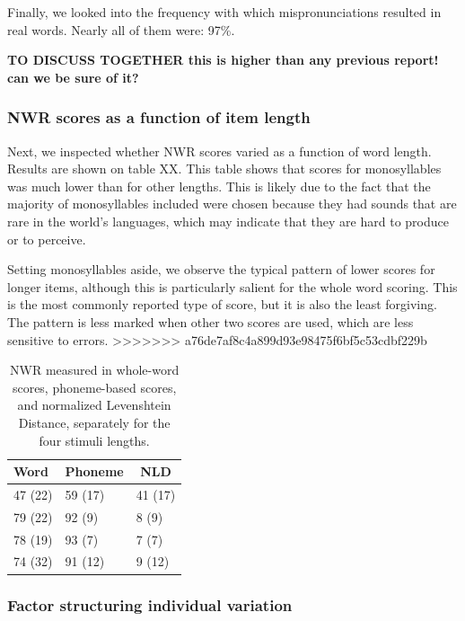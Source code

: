 \documentclass[english,,man,floatsintext]{apa6}
\begin{document}
Finally, we looked into the frequency with which mispronunciations
resulted in real words. Nearly all of them were: 97\%.

\textbf{TO DISCUSS TOGETHER this is higher than any previous report! can
we be sure of it?}

\subsubsection{NWR scores as a function of item
length}\label{nwr-scores-as-a-function-of-item-length}

Next, we inspected whether NWR scores varied as a function of word
length. Results are shown on table XX. This table shows that scores for
monosyllables was much lower than for other lengths. This is likely due
to the fact that the majority of monosyllables included were chosen
because they had sounds that are rare in the world's languages, which
may indicate that they are hard to produce or to perceive.

Setting monosyllables aside, we observe the typical pattern of lower
scores for longer items, although this is particularly salient for the
whole word scoring. This is the most commonly reported type of score,
but it is also the least forgiving. The pattern is less marked when
other two scores are used, which are less sensitive to errors.
>>>>>>> a76de7af8c4a899d93e98475f6bf5c53cdbf229b

\begin{table}[tbp]
\begin{center}
\begin{threeparttable}
\caption{\label{tab:tablength}NWR measured in whole-word scores, phoneme-based scores, and normalized Levenshtein Distance, separately for the four stimuli lengths.}
\begin{tabular}{lll}
\toprule
Word & \multicolumn{1}{c}{Phoneme} & \multicolumn{1}{c}{NLD}\\
\midrule
47 (22) & 59 (17) & 41 (17)\\
79 (22) & 92 (9) & 8 (9)\\
78 (19) & 93 (7) & 7 (7)\\
74 (32) & 91 (12) & 9 (12)\\
\bottomrule
\end{tabular}
\end{threeparttable}
\end{center}
\end{table}

\subsubsection{Factor structuring individual
variation}\label{factor-structuring-individual-variation}
\end{document}
